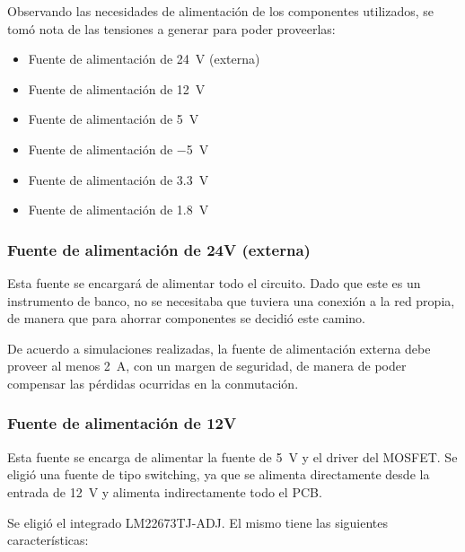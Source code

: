 \documentclass[../et.tex]{subfiles}
\begin{document}
Observando las necesidades de alimentación de los componentes utilizados, se tomó nota de las tensiones a generar para poder proveerlas:

\begin{itemize}
  \item Fuente de alimentación de \SI{24}{V} (externa)
  \item Fuente de alimentación de \SI{12}{V}
  \item Fuente de alimentación de \SI{5}{V}
  \item Fuente de alimentación de \SI{-5}{V}
  \item Fuente de alimentación de \SI{3.3}{V}
  \item Fuente de alimentación de \SI{1.8}{V}
\end{itemize}

  \subsubsection{Fuente de alimentación de 24V (externa)}
  Esta fuente se encargará de alimentar todo el circuito. Dado que este es un instrumento de banco, no se necesitaba que tuviera una conexión a la red propia, de manera que para ahorrar componentes se decidió este camino.

  De acuerdo a simulaciones realizadas, la fuente de alimentación externa debe proveer al menos \SI{2}{A}, con un margen de seguridad, de manera de poder compensar las pérdidas ocurridas en la conmutación.

  \subsubsection{Fuente de alimentación de 12V}
  Esta fuente se encarga de alimentar la fuente de \SI{5}{V} y el driver del MOSFET. Se eligió una fuente de tipo switching, ya que se alimenta directamente desde la entrada de \SI{12}{V} y alimenta indirectamente todo el PCB.

  Se eligió el integrado LM22673TJ-ADJ. El mismo tiene las siguientes características:
\end{document}
